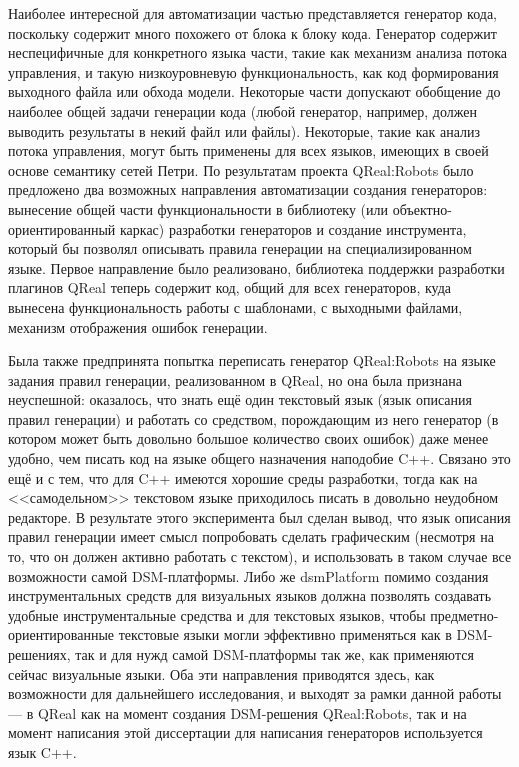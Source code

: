 Наиболее интересной для автоматизации частью представляется генератор кода, поскольку 
содержит много похожего от блока к блоку кода. Генератор содержит неспецифичные для 
конкретного языка части, такие как механизм анализа потока управления, и такую низкоуровневую 
функциональность, как код формирования выходного файла или обхода модели. Некоторые 
части допускают обобщение до наиболее общей задачи генерации кода (любой генератор, 
например, должен выводить результаты в некий файл или файлы). Некоторые, такие как 
анализ потока управления, могут быть применены для всех языков, имеющих в своей основе 
семантику сетей Петри. По результатам проекта QReal:Robots было предложено два возможных 
направления автоматизации создания генераторов: вынесение общей части функциональности 
в библиотеку (или объектно-ориентированный каркас) разработки генераторов и создание 
инструмента, который бы позволял описывать правила генерации на специализированном 
языке.  Первое направление было реализовано, библиотека поддержки разработки плагинов 
QReal теперь содержит код, общий для всех генераторов, куда вынесена функциональность 
работы с шаблонами, с выходными файлами, механизм отображения ошибок генерации. 

Была также предпринята попытка переписать генератор QReal:Robots на языке задания 
правил генерации, реализованном в QReal, но она была признана неуспешной: оказалось, 
что знать ещё один текстовый язык (язык описания правил генерации) и работать со средством, 
порождающим из него генератор (в котором может быть довольно большое количество своих ошибок) 
даже менее удобно, чем писать код на языке общего назначения наподобие C++. Связано это 
ещё и с тем, что для C++ имеются хорошие среды разработки, тогда как на <<самодельном>> 
текстовом языке приходилось писать в довольно неудобном редакторе. В результате этого 
эксперимента был сделан вывод, что язык описания правил генерации имеет смысл попробовать 
сделать графическим (несмотря на то, что он должен активно работать с текстом), и использовать 
в таком случае все возможности самой \ac{DSM}-платформы. Либо же \ac{dsmPlatform} помимо 
создания инструментальных средств для визуальных языков должна позволять создавать удобные инструментальные средства 
и для текстовых языков, чтобы предметно-ориентированные текстовые языки могли эффективно 
применяться как в \ac{DSM}-решениях, так и для нужд самой \ac{DSM}-платформы так же, как применяются 
сейчас визуальные языки. Оба эти направления приводятся здесь, как возможности для 
дальнейшего исследования, и выходят за рамки данной работы --- в QReal как на момент 
создания \ac{DSM}-решения QReal:Robots, так и на момент написания этой диссертации для 
написания генераторов используется язык C++.

